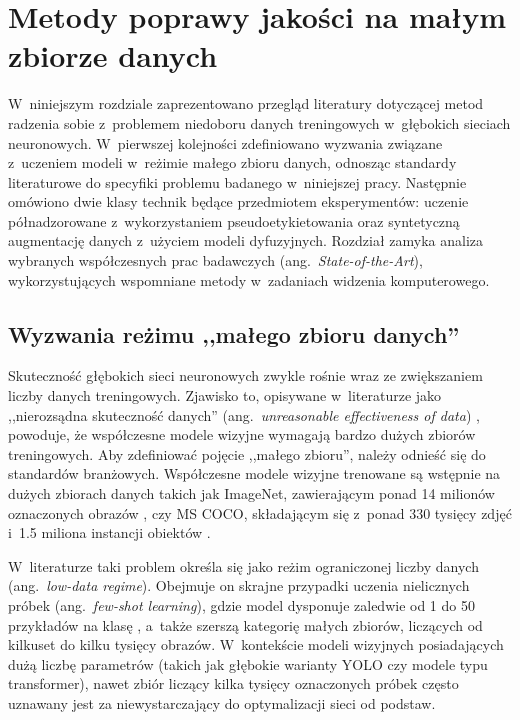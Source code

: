 \chapter{Metody poprawy jakości na małym zbiorze danych}

W~niniejszym rozdziale zaprezentowano przegląd literatury dotyczącej metod radzenia sobie z~problemem niedoboru danych treningowych w~głębokich sieciach neuronowych. W~pierwszej kolejności zdefiniowano wyzwania związane z~uczeniem modeli w~reżimie małego zbioru danych, odnosząc standardy literaturowe do specyfiki problemu badanego w~niniejszej pracy. Następnie omówiono dwie klasy technik będące przedmiotem eksperymentów: uczenie półnadzorowane z~wykorzystaniem pseudoetykietowania oraz syntetyczną augmentację danych z~użyciem modeli dyfuzyjnych. Rozdział zamyka analiza wybranych współczesnych prac badawczych (ang.\ \emph{State-of-the-Art}), wykorzystujących wspomniane metody w~zadaniach widzenia komputerowego.

\section{Wyzwania reżimu ,,małego zbioru danych''}

Skuteczność głębokich sieci neuronowych zwykle rośnie wraz ze zwiększaniem liczby danych treningowych. Zjawisko to, opisywane w~literaturze jako ,,nierozsądna skuteczność danych'' (ang.\ \emph{unreasonable effectiveness of data}) \cite{Sun2017}, powoduje, że współczesne modele wizyjne wymagają bardzo dużych zbiorów treningowych. Aby zdefiniować pojęcie ,,małego zbioru'', należy odnieść się do standardów branżowych. Współczesne modele wizyjne trenowane są wstępnie na dużych zbiorach danych takich jak ImageNet, zawierającym ponad 14 milionów oznaczonych obrazów \cite{Deng2009}, czy MS COCO, składającym się z~ponad 330 tysięcy zdjęć i~1.5 miliona instancji obiektów \cite{Lin2014}. 

W~literaturze taki problem określa się jako reżim ograniczonej liczby danych (ang.\ \emph{low-data regime}). Obejmuje on skrajne przypadki uczenia nielicznych próbek (ang.\ \emph{few-shot learning}), gdzie model dysponuje zaledwie od 1 do 50 przykładów na klasę \cite{Wang2020FewShot}, a~także szerszą kategorię małych zbiorów, liczących od kilkuset do kilku tysięcy obrazów. W~kontekście modeli wizyjnych posiadających dużą liczbę parametrów (takich jak głębokie warianty YOLO czy modele typu transformer), nawet zbiór liczący kilka tysięcy oznaczonych próbek często uznawany jest za niewystarczający do optymalizacji sieci od podstaw.

